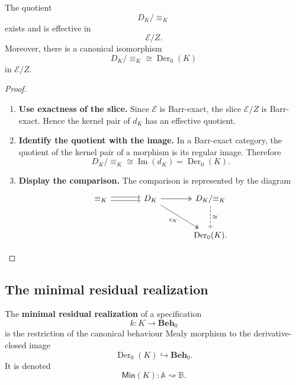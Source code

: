 \begin{theorem}
\label{thm:categorical-myhill-nerode-quotient}
    The quotient
    \[
        D_K/{\equiv_K}
    \]
    exists and is effective in
    \[
        \mathcal E/Z.
    \]
    Moreover, there is a canonical isomorphism
    \[
        D_K/{\equiv_K}
        \cong
        \operatorname{Der}_0(K)
    \]
    in \(\mathcal E/Z\).
\end{theorem}
\begin{proof}
    \leavevmode
    \begin{enumerate}
        \item \textbf{Use exactness of the slice.} Since \(\mathcal E\) is Barr-exact, the slice \(\mathcal E/Z\) is Barr-exact. Hence the kernel pair of \(d_K\) has an effective quotient.

        \item \textbf{Identify the quotient with the image.} In a Barr-exact category, the quotient of the kernel pair of a morphism is its regular image. Therefore
        \[
            D_K/{\equiv_K}
            \cong
            \operatorname{Im}(d_K)
            =
            \operatorname{Der}_0(K).
        \]

        \item \textbf{Display the comparison.} The comparison is represented by the diagram
        \[
            \begin{tikzcd}[column sep=large, row sep=large]
                    {\equiv_K}
                        \arrow[r, shift left=0.5ex]
                        \arrow[r, shift right=0.5ex]
                &
                    D_K
                        \arrow[r, two heads]
                        \arrow[dr, two heads, "e_K"']
                &
                    D_K/{\equiv_K}
                        \arrow[d, dashed, "\cong"]
                \\
                &
                &
                    \operatorname{Der}_0(K).
            \end{tikzcd}
        \]
    \end{enumerate}
\end{proof}

\subsection{The minimal residual realization}
\label{subsec:minimal-residual-realization}

\begin{definition}
\label{def:minimal-residual-realization}
    The \textbf{minimal residual realization} of a specification
    \[
        k:K\to\mathbf{Beh}_0
    \]
    is the restriction of the canonical behaviour Mealy morphism to the derivative-closed image
    \[
        \operatorname{Der}_0(K)\hookrightarrow\mathbf{Beh}_0.
    \]
    It is denoted
    \[
        \mathsf{Min}(K):\mathbb A\rightsquigarrow\mathbb B.
    \]
\end{definition}

